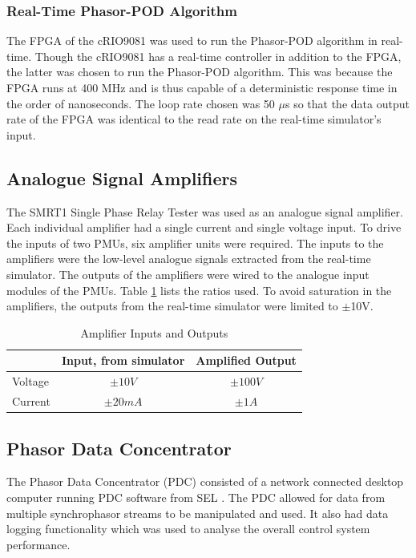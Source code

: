 \documentclass[conference]{IEEEtran}
\begin{document}
\subsubsection*{Real-Time Phasor-POD Algorithm} The FPGA of the cRIO9081 was used to run the Phasor-POD algorithm in real-time. Though the cRIO9081 has a real-time controller in addition to the FPGA, the latter was chosen to run the Phasor-POD algorithm. This was because the FPGA runs at 400 MHz and is thus capable of a deterministic response time in the order of nanoseconds. The loop rate chosen was 50 $\mu$s so that the data output rate of the FPGA was identical to the read rate on the real-time simulator's input.

\subsection{Analogue Signal Amplifiers}
The SMRT1 Single Phase Relay Tester \cite{Megger} was used as an analogue signal amplifier. Each individual amplifier had a single current and single voltage input. To drive the inputs of two PMUs, six amplifier units were required. The inputs to the amplifiers were the low-level analogue signals extracted from the real-time simulator. The outputs of the amplifiers were wired to the analogue input modules of the PMUs. Table \ref{AmplifierTable} lists the ratios used. To avoid saturation in the amplifiers, the outputs from the real-time simulator were limited to $\pm$10V. 

\begin{table}[!ht]
\caption{Amplifier Inputs and Outputs}\label{AmplifierTable}
\begin{center}
\begin{tabular}{|l|c|c|}
\hline \textbf{} & \textbf{Input, from simulator} & \textbf{Amplified Output} \\
\hline Voltage &$\pm10 V$&$\pm 100 V$\\ 
\hline Current & $\pm 20 mA$ & $\pm 1 A$\\ 
\hline 
\end{tabular}
\end{center}
\end{table} 

\subsection{Phasor Data Concentrator}
The Phasor Data Concentrator (PDC) consisted of a network connected desktop computer running PDC software from SEL \cite{SEL}. The PDC allowed for data from multiple synchrophasor streams to be manipulated and used. It also had data logging functionality which was used to analyse the overall control system performance.
\end{document}

